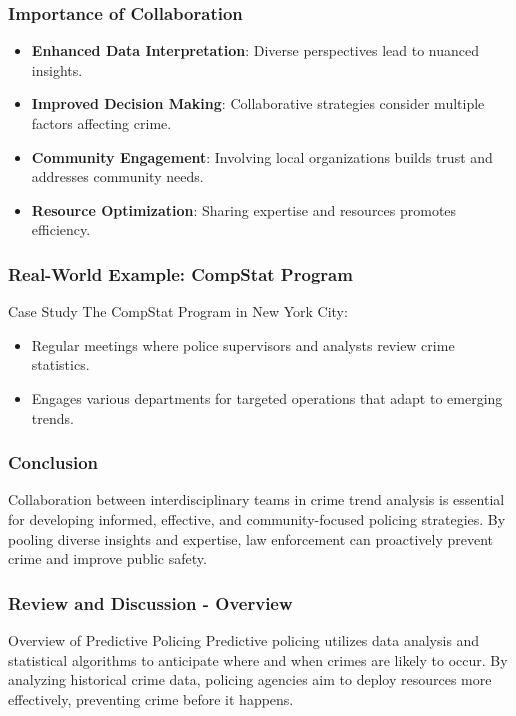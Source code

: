 \documentclass[aspectratio=169]{beamer}
\begin{document}
\begin{frame}[fragile]
    \frametitle{Importance of Collaboration}
    \begin{itemize}
        \item \textbf{Enhanced Data Interpretation}: Diverse perspectives lead to nuanced insights.
        \item \textbf{Improved Decision Making}: Collaborative strategies consider multiple factors affecting crime.
        \item \textbf{Community Engagement}: Involving local organizations builds trust and addresses community needs.
        \item \textbf{Resource Optimization}: Sharing expertise and resources promotes efficiency.
    \end{itemize}
\end{frame}

\begin{frame}[fragile]
    \frametitle{Real-World Example: CompStat Program}
    \begin{block}{Case Study}
        The CompStat Program in New York City:
        \begin{itemize}
            \item Regular meetings where police supervisors and analysts review crime statistics.
            \item Engages various departments for targeted operations that adapt to emerging trends.
        \end{itemize}
    \end{block}
\end{frame}

\begin{frame}[fragile]
    \frametitle{Conclusion}
    Collaboration between interdisciplinary teams in crime trend analysis is essential for developing informed, effective, and community-focused policing strategies. By pooling diverse insights and expertise, law enforcement can proactively prevent crime and improve public safety.
\end{frame}

\begin{frame}[fragile]
    \frametitle{Review and Discussion - Overview}
    \begin{block}{Overview of Predictive Policing}
        Predictive policing utilizes data analysis and statistical algorithms to anticipate where and when crimes are likely to occur. By analyzing historical crime data, policing agencies aim to deploy resources more effectively, preventing crime before it happens.
    \end{block}
\end{frame}
\end{document}
